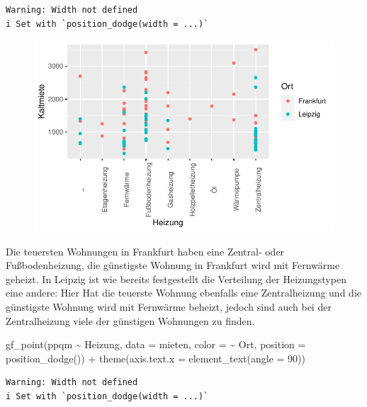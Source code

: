 \documentclass[
  a4paper,
  DIV=11]{scrartcl}
\newenvironment{Shaded}{\begin{snugshade}}{\end{snugshade}}
\newcommand{\AttributeTok}[1]{\textcolor[rgb]{0.40,0.45,0.13}{#1}}
\newcommand{\DecValTok}[1]{\textcolor[rgb]{0.68,0.00,0.00}{#1}}
\newcommand{\FunctionTok}[1]{\textcolor[rgb]{0.28,0.35,0.67}{#1}}
\newcommand{\NormalTok}[1]{\textcolor[rgb]{0.00,0.23,0.31}{#1}}
\newcommand{\SpecialCharTok}[1]{\textcolor[rgb]{0.37,0.37,0.37}{#1}}
\begin{document}
\begin{verbatim}
Warning: Width not defined
i Set with `position_dodge(width = ...)`
\end{verbatim}

\begin{figure}[H]

{\centering \includegraphics{Mietmodellierung_files/figure-pdf/unnamed-chunk-13-1.pdf}

}

\end{figure}

Die teuersten Wohnungen in Frankfurt haben eine Zentral- oder
Fußbodenheizung, die günstigste Wohnung in Frankfurt wird mit Fernwärme
geheizt. In Leipzig ist wie bereits festgestellt die Verteilung der
Heizungstypen eine andere: Hier Hat die teuerste Wohnung ebenfalls eine
Zentralheizung und die günstigste Wohnung wird mit Fernwärme beheizt,
jedoch sind auch bei der Zentralheizung viele der günstigen Wohnungen zu
finden.

\begin{Shaded}
\begin{Highlighting}[]
\FunctionTok{gf\_point}\NormalTok{(ppqm }\SpecialCharTok{\textasciitilde{}}\NormalTok{ Heizung, }\AttributeTok{data =}\NormalTok{ mieten, }\AttributeTok{color =} \SpecialCharTok{\textasciitilde{}}\NormalTok{ Ort, }\AttributeTok{position =} \FunctionTok{position\_dodge}\NormalTok{()) }\SpecialCharTok{+} 
  \FunctionTok{theme}\NormalTok{(}\AttributeTok{axis.text.x =} \FunctionTok{element\_text}\NormalTok{(}\AttributeTok{angle =} \DecValTok{90}\NormalTok{))}
\end{Highlighting}
\end{Shaded}

\begin{verbatim}
Warning: Width not defined
i Set with `position_dodge(width = ...)`
\end{verbatim}
\end{document}
